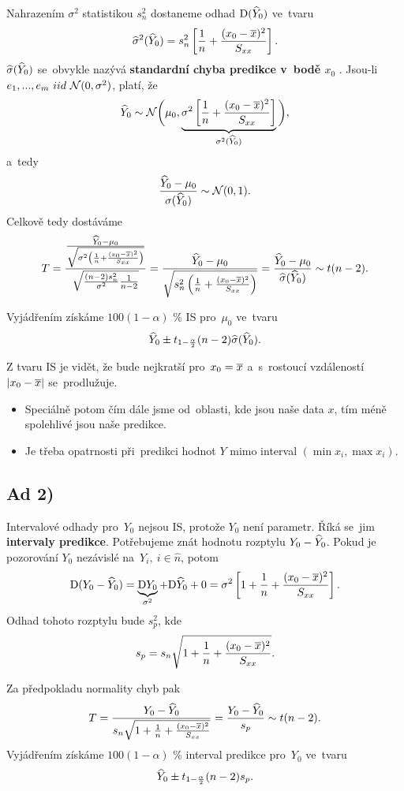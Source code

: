 	Nahrazením $\sigma^2$ statistikou $s_n^2$ dostaneme odhad $\mathrm{D}(\widehat{Y}_0)$ ve~tvaru
	 $$ \widehat{\sigma}^2(\widehat{Y}_0) = s_n^2\left[\frac{1}{n}+\frac{(x_0-\overline{x})^2}{S_{xx}} \right]. $$
	 $\widehat{\sigma}(\widehat{Y}_0)$ se~obvykle nazývá \textbf{standardní chyba predikce v~bodě $x_0$ }. Jsou-li $e_1,...,e_m~iid~\mathcal{N}(0,\sigma^2)$, platí, že
	 $$ \widehat{Y}_0\sim\mathcal{N}\bigg(\mu_0,\underbrace{\sigma^2\left[\frac{1}{n} + \frac{(x_0-\overline{x})^2}{S_{xx}} \right]}_{\sigma^2(\widehat{Y}_0)} \bigg), $$a~tedy
	 $$ \frac{\widehat{Y}_0-\mu_0}{\sigma(\widehat{Y}_0)}\sim\mathcal{N}(0,1). $$
	Celkově tedy dostáváme
	 $$ T = \frac{\frac{\widehat{Y}_0-\mu_0}{\sqrt{\sigma^2\left(\frac{1}{n}+\frac{(x_0-\overline{x})^2}{S_{xx}}\right)}}}{\sqrt{\frac{(n-2)s_n^2}{\sigma^2}\frac{1}{n-2}}} = \frac{\widehat{Y}_0-\mu_0}{\sqrt{s_n^2\left(\frac{1}{n}+\frac{(x_0-\overline{x})^2}{S_{xx}} \right)}} = \frac{\widehat{Y}_0-\mu_0}{\widehat{\sigma}(\widehat{Y}_0)}\sim t(n-2). $$
	
	Vyjádřením získáme $100(1-\alpha)$ \% IS pro~$\mu_0$ ve~tvaru $$ \widehat{Y}_0\pm t_{1-\frac{\alpha}{2}}(n-2)\widehat{\sigma}(\widehat{Y}_0). $$
	\begin{remark}
		Z tvaru IS je vidět, že bude nejkratší pro~$x_0 = \overline{x}$ a~s~rostoucí vzdáleností $| x_0-\overline{x} |$ se~prodlužuje.\begin{itemize}
			\item  Speciálně potom čím dále jsme od~oblasti, kde jsou naše data $x$, tím méně spolehlivé jsou naše predikce.
			\item Je třeba opatrnosti při~predikci hodnot $Y$ mimo interval $(\min x_i,\max x_i)$.
		\end{itemize}
\end{remark}

\subsection*{Ad 2)}
Intervalové odhady pro~$Y_0$ nejsou IS, protože $Y_0$ není parametr. Říká se~jim \textbf{intervaly predikce}. Potřebujeme znát hodnotu rozptylu $Y_0-\widehat{Y}_0$. Pokud je pozorování $Y_0$ nezávislé na~$Y_i,~i\in\widehat{n}$, potom
 $$ \mathrm{D}(Y_0-\widehat{Y}_0) = \underbrace{\mathrm{D} Y_0}_{\sigma^2}+\mathrm{D} \widehat{Y}_0+0 = \sigma^2\left[1+\frac{1}{n}+\frac{(x_0-\overline{x})^2}{S_{xx}} \right]. $$ Odhad tohoto rozptylu bude $s_p^2$, kde
 $$ s_p = s_n\sqrt{1+\frac{1}{n}+\frac{(x_0-\overline{x})^2}{S_{xx}}}. $$

Za předpokladu normality chyb pak
 $$ T = \frac{Y_0-\widehat{Y}_0}{s_n\sqrt{1+\frac{1}{n}+\frac{(x_0-\overline{x})^2}{S_{xx}}}} = \frac{Y_0-\widehat{Y}_0}{s_p}\sim t(n-2). $$
Vyjádřením získáme $100(1-\alpha)$ \% interval predikce pro~$Y_0$ ve~tvaru
 $$ \widehat{Y}_0 \pm t_{1-\frac{\alpha}{2}}(n-2)s_p. $$

